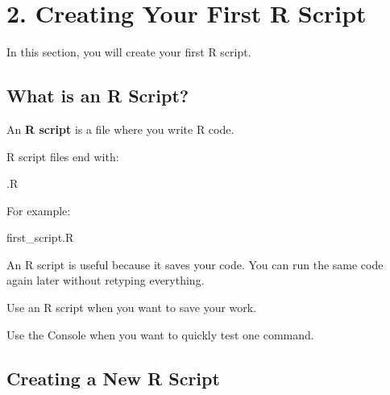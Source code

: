 \documentclass[
  letterpaper,
  DIV=11,
  numbers=noendperiod]{scrartcl}
\author{}
\date{}
\newenvironment{Shaded}{\begin{snugshade}}{\end{snugshade}}
\newcommand{\NormalTok}[1]{\textcolor[rgb]{0.00,0.23,0.31}{#1}}
\renewcommand*\contentsname{Table of contents}
\newcommand\contentsname{Table of contents}
\begin{document}
\renewcommand*\contentsname{Table of contents}
{
\setcounter{tocdepth}{3}
\tableofcontents
}

\section{2. Creating Your First R
Script}\label{creating-your-first-r-script}

In this section, you will create your first R script.

\subsection{What is an R Script?}\label{what-is-an-r-script}

An \textbf{R script} is a file where you write R code.

R script files end with:

\begin{Shaded}
\begin{Highlighting}[]
\NormalTok{.R}
\end{Highlighting}
\end{Shaded}

For example:

\begin{Shaded}
\begin{Highlighting}[]
\NormalTok{first\_script.R}
\end{Highlighting}
\end{Shaded}

An R script is useful because it saves your code. You can run the same
code again later without retyping everything.

\begin{tcolorbox}[enhanced jigsaw, arc=.35mm, bottomrule=.15mm, bottomtitle=1mm, breakable, colback=white, colbacktitle=quarto-callout-tip-color!10!white, colframe=quarto-callout-tip-color-frame, coltitle=black, left=2mm, leftrule=.75mm, opacityback=0, opacitybacktitle=0.6, rightrule=.15mm, title=\textcolor{quarto-callout-tip-color}{\faLightbulb}\hspace{0.5em}{Tip}, titlerule=0mm, toprule=.15mm, toptitle=1mm]

Use an R script when you want to save your work.

Use the Console when you want to quickly test one command.

\end{tcolorbox}

\subsection{Creating a New R Script}\label{creating-a-new-r-script}
\end{document}
